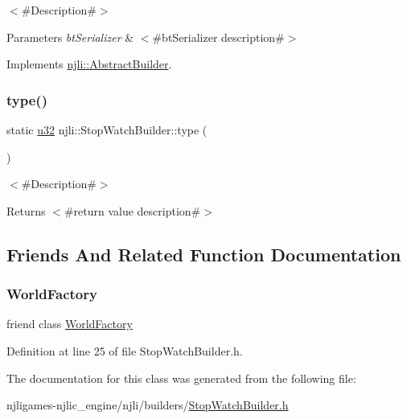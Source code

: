 $<$\#\+Description\#$>$


\begin{DoxyParams}{Parameters}
{\em bt\+Serializer} & $<$\#bt\+Serializer description\#$>$ \\
\hline
\end{DoxyParams}


Implements \mbox{\hyperlink{classnjli_1_1_abstract_builder_ab66b774e02ccb9da554c9aab7fa6d981}{njli\+::\+Abstract\+Builder}}.

\mbox{\label{classnjli_1_1_stop_watch_builder_ada9b01fe52740d133e80132cc492828f}} 
\subsubsection{\texorpdfstring{type()}{type()}}
{\footnotesize\ttfamily static \mbox{\hyperlink{_util_8h_a10e94b422ef0c20dcdec20d31a1f5049}{u32}} njli\+::\+Stop\+Watch\+Builder\+::type (\begin{DoxyParamCaption}{ }\end{DoxyParamCaption})\hspace{0.3cm}{\ttfamily [static]}}

$<$\#\+Description\#$>$

\begin{DoxyReturn}{Returns}
$<$\#return value description\#$>$ 
\end{DoxyReturn}


\subsection{Friends And Related Function Documentation}
\mbox{\label{classnjli_1_1_stop_watch_builder_acb96ebb09abe8f2a37a915a842babfac}} 
\subsubsection{\texorpdfstring{World\+Factory}{WorldFactory}}
{\footnotesize\ttfamily friend class \mbox{\hyperlink{classnjli_1_1_world_factory}{World\+Factory}}\hspace{0.3cm}{\ttfamily [friend]}}



Definition at line 25 of file Stop\+Watch\+Builder.\+h.



The documentation for this class was generated from the following file\+:\begin{DoxyCompactItemize}
\item 
njligames-\/njlic\+\_\+engine/njli/builders/\mbox{\hyperlink{_stop_watch_builder_8h}{Stop\+Watch\+Builder.\+h}}\end{DoxyCompactItemize}
